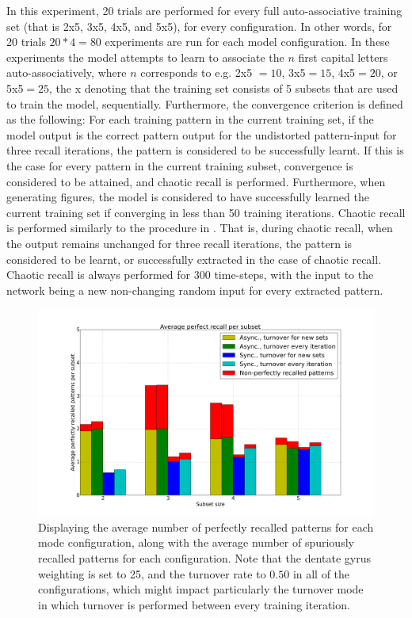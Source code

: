 In this experiment, 20 trials are performed for every full auto-associative training set (that is 2x5, 3x5, 4x5, and 5x5), for every configuration. In other words, for 20 trials $20 * 4 = 80$ experiments are run for each model configuration. In these experiments the model attempts to learn to associate the $n$ first capital letters auto-associatively, where $n$ corresponds to e.g. 2x5 $= 10$, 3x5$=15$, 4x5$=20$, or 5x5$=25$, the x denoting that the training set consists of 5 subsets that are used to train the model, sequentially. 
Furthermore, the convergence criterion is defined as the following: For each training pattern in the current training set, if the model output is the correct pattern output for the undistorted pattern-input for three recall iterations, the pattern is considered to be successfully learnt. If this is the case for every pattern in the current training subset, convergence is considered to be attained, and chaotic recall is performed. Furthermore, when generating figures, the model is considered to have successfully learned the current training set if converging in less than 50 training iterations. Chaotic recall is performed similarly to the procedure in \citep{Hattori2010, Hattori2014}. That is, during chaotic recall, when the output remains unchanged for three recall iterations, the pattern is considered to be learnt, or successfully extracted in the case of chaotic recall. Chaotic recall is always performed for 300 time-steps, with the input to the network being a new non-changing random input for every extracted pattern.


\begin{figure}
    \centering
    \includegraphics[width=14cm]{fig/average_perfect_recall_rates_by_set_size_with_spurious_bars}
    \caption{Displaying the average number of perfectly recalled patterns for each mode configuration, along with the average number of spuriously recalled patterns for each configuration. Note that the dentate gyrus weighting is set to 25, and the turnover rate to $0.50$ in all of the configurations, which might impact particularly the turnover mode in which turnover is performed between every training iteration.}
    \label{fig:avg_perfect_recall_rates_with_spurious_bars}
\end{figure}

